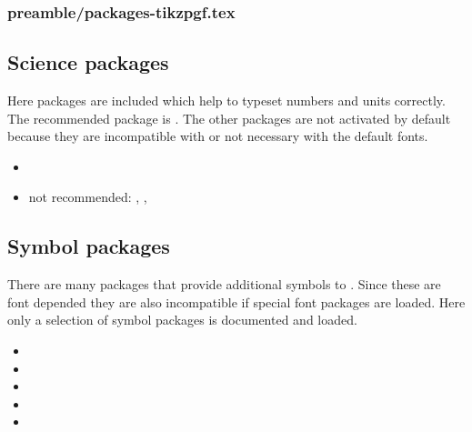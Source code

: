 
\subsubsection{preamble/packages-tikzpgf.tex}


\subsection{Science packages}
\label{sec:packages:science}

Here packages are included which help to typeset numbers and units correctly.
The recommended package is . The other packages are not activated by default because they are incompatible with  or not necessary with the default fonts.

\begin{itemize}[noitemsep]
\item {}
\item not recommended: , ,  
\end{itemize}


\subsection{Symbol packages}
\label{sec:packages:symbols}

There are many packages that provide additional symbols to \latex . Since these are font depended they are also incompatible if special font packages are loaded. Here only a selection of symbol packages is documented and loaded.

\begin{itemize}[noitemsep]
\item {}
\item {}
\item {}
\item {}
\item {}
\end{itemize}

